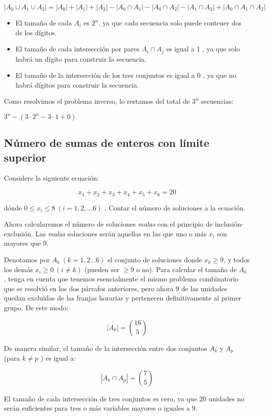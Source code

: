 $$|A_0 \cup A_1 \cup A_2| = |A_0| + |A_1| + |A_2| - |A_0 \cap A_1| - |A_0 \cap A_2| - |A_1 \cap A_2| + |A_0 \cap A_1 \cap A_2|$$

\begin{itemize}
	\item El tamaño de cada $A_i$ es $2^n$, ya que cada secuencia solo puede contener dos de los dígitos.
	\item El tamaño de cada intersección por pares $A_i \cap A_j$ es igual a $1$ , ya que solo habrá un dígito para construir la secuencia.
	\item El tamaño de la intersección de los tres conjuntos es igual a $0$ , ya que no habrá dígitos para construir la secuencia.
\end{itemize}

Como resolvimos el problema inverso, lo restamos del total de $3^n$ secuencias:

$3^n - (3 \cdot 2^n - 3 \cdot 1 + 0)$

\subsection{Número de sumas de enteros con límite superior}

Considere la siguiente ecuación:

$$x_1 + x_2 + x_3 + x_4 + x_5 + x_6 = 20$$

dónde $0 \le x_i \le 8 ~ (i = 1,2,\ldots 6)$ . Contar el número de soluciones a la ecuación. 

Ahora calcularemos el número de soluciones \emph{malas} con el principio de inclusión-exclusión. Las \emph{malas} soluciones serán aquellas en las que uno o más $x_i$ son mayores que $9$.

Denotamos por $A_k ~ (k = 1,2\ldots 6)$ el conjunto de soluciones donde $x_k \ge 9$, y todos los demás $x_i \ge 0 ~ (i \ne k)$ (pueden ser $\ge 9$ o no). Para calcular el tamaño de $A_k$ , tenga en cuenta que tenemos esencialmente el mismo problema combinatorio que se resolvió en los dos párrafos anteriores, pero ahora $9$ de las unidades quedan excluidas de las franjas horarias y pertenecen definitivamente al primer grupo. De este modo:

$$| A_k | = \binom{16}{5}$$

De manera similar, el tamaño de la intersección entre dos conjuntos $A_k$ y $A_p$ (para $k \ne p$ ) es igual a:

$$\left| A_k \cap A_p \right| = \binom{7}{5}$$

El tamaño de cada intersección de tres conjuntos es cero, ya que $20$ unidades no serán suficientes para tres o más variables mayores o iguales a $9$.


